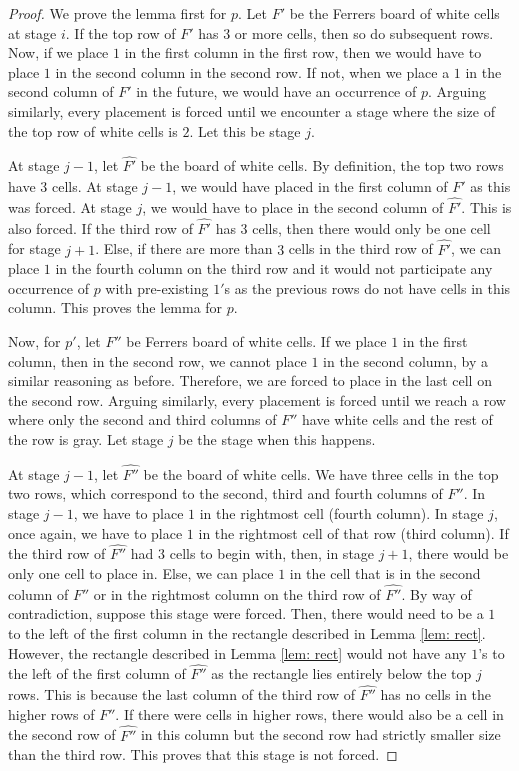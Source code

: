 \documentclass[12pt, english, a4paper]{article}
\theoremstyle{plain}
\theoremstyle{definition}
\theoremstyle{remark}
\begin{document}
\begin{proof}
    We prove the lemma first for $p$. Let $F'$ be the Ferrers board of white cells at stage $i$. If the top row of $F'$ has $3$ or more cells, then so do subsequent rows. Now, if we place $1$ in the first column in the first row, then we would have to place $1$ in the second column in the second row. If not, when we place a $1$ in the second column of $F'$ in the future, we would have an occurrence of $p$. Arguing similarly, every placement is forced until we encounter a stage where the size of the top row of white cells is $2$. Let this be stage $j$.

   At stage $j-1$, let $\hat{F'}$ be the board of white cells. By definition, the top two rows have $3$ cells. At stage $j-1$, we would have placed in the first column of $\hat{F'}$ as this was forced. At stage $j$, we would have to place in the second column of $\hat{F'}$. This is also forced. If the third row of $\hat{F'}$ has $3$ cells, then there would only be one cell for stage $j+1$. Else, if there are more than $3$ cells in the third row of $\hat{F'}$, we can place $1$ in the fourth column on the third row and it would not participate any occurrence of $p$ with pre-existing $1'$s as the previous rows do not have cells in this column. This proves the lemma for $p$.

    Now, for $p'$, let $F''$ be Ferrers board of white cells. If we place $1$ in the first column, then in the second row, we cannot place $1$ in the second column, by a similar reasoning as before. Therefore, we are forced to place in the last cell on the second row.
    Arguing similarly, every placement is forced until we reach a row where only the second and third columns of $F''$ have white cells and the rest of the row is gray. Let stage $j$ be the stage when this happens.

    At stage $j-1$, let $\hat{F''}$ be the board of white cells. We have three cells in the top two rows, which correspond to the second, third and fourth columns of $F''$. In stage $j-1$, we have to place $1$ in the rightmost cell (fourth column). In stage $j$, once again, we have to place $1$ in the rightmost cell of that row (third column). If the third row of $\hat{F''}$ had $3$ cells to begin with, then, in stage $j+1$, there would be only one cell to place in. Else, we can place $1$ in the cell that is in the second column of $F''$ or in the rightmost column on the third row of $\hat{F''}$.
    By way of contradiction, suppose this stage were forced. Then, there would need to be a $1$ to the left of the first column in the rectangle described in Lemma \ref{lem: rect}.
    However, the rectangle described in Lemma \ref{lem: rect} would not have any $1$'s to the left of the first column of $\hat{F''}$ as the rectangle lies entirely below the top $j$ rows. This is because the last column of the third row of $\hat{F''}$ has no cells in the higher rows of $F''$. If there were cells in higher rows, there would also be a cell in the second row of $\hat{F''}$ in this column but the second row had strictly smaller size than the third row. This proves that this stage is not forced.
\end{proof}
\end{document}
